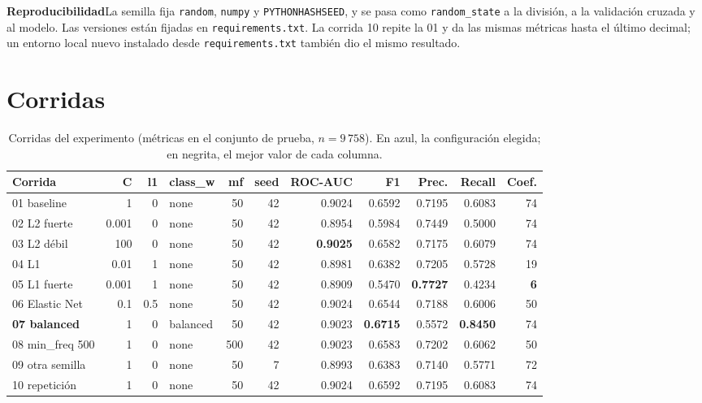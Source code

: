 \documentclass[11pt,letterpaper]{article}
\newcommand{\bloque}[1]{{\bfseries #1}\quad}
\begin{document}
\bloque{Reproducibilidad}La semilla fija \texttt{random}, \texttt{numpy} y \texttt{PYTHONHASHSEED}, y se pasa como
\texttt{random\_state} a la división, a la validación cruzada y al modelo. Las versiones están fijadas en
\texttt{requirements.txt}. La corrida 10 repite la 01 y da las mismas métricas hasta el último decimal; un entorno
local nuevo instalado desde \texttt{requirements.txt} también dio el mismo resultado.

\newpage
\section{Corridas}

\begin{table}[H]
\centering
\small
{}
\caption{Corridas del experimento (métricas en el conjunto de prueba, $n = 9\,758$). En azul, la configuración
elegida; en negrita, el mejor valor de cada columna.}
\label{tab:corridas}
\begin{tabular}{@{}lrrlrrrrrrr@{}}
\toprule
\rowcolor{white}
\textbf{Corrida} & \textbf{C} & \textbf{l1} & \textbf{class\_w} & \textbf{mf} & \textbf{seed} &
\textbf{ROC-AUC} & \textbf{F1} & \textbf{Prec.} & \textbf{Recall} & \textbf{Coef.} \\
\midrule
01 baseline        & 1     & 0   & none     & 50  & 42 & 0.9024 & 0.6592 & 0.7195 & 0.6083 & 74 \\
02 L2 fuerte       & 0.001 & 0   & none     & 50  & 42 & 0.8954 & 0.5984 & 0.7449 & 0.5000 & 74 \\
03 L2 débil        & 100   & 0   & none     & 50  & 42 & \textbf{0.9025} & 0.6582 & 0.7175 & 0.6079 & 74 \\
04 L1              & 0.01  & 1   & none     & 50  & 42 & 0.8981 & 0.6382 & 0.7205 & 0.5728 & 19 \\
05 L1 fuerte       & 0.001 & 1   & none     & 50  & 42 & 0.8909 & 0.5470 & \textbf{0.7727} & 0.4234 & \textbf{6} \\
06 Elastic Net     & 0.1   & 0.5 & none     & 50  & 42 & 0.9024 & 0.6544 & 0.7188 & 0.6006 & 50 \\
\rowcolor{tecclaro}
\textbf{07 balanced} & 1   & 0   & balanced & 50  & 42 & 0.9023 & \textbf{0.6715} & 0.5572 & \textbf{0.8450} & 74 \\
08 min\_freq 500   & 1     & 0   & none     & 500 & 42 & 0.9023 & 0.6583 & 0.7202 & 0.6062 & 50 \\
09 otra semilla    & 1     & 0   & none     & 50  & 7  & 0.8993 & 0.6383 & 0.7140 & 0.5771 & 72 \\
10 repetición      & 1     & 0   & none     & 50  & 42 & 0.9024 & 0.6592 & 0.7195 & 0.6083 & 74 \\
\bottomrule
\end{tabular}
\end{table}
\end{document}

